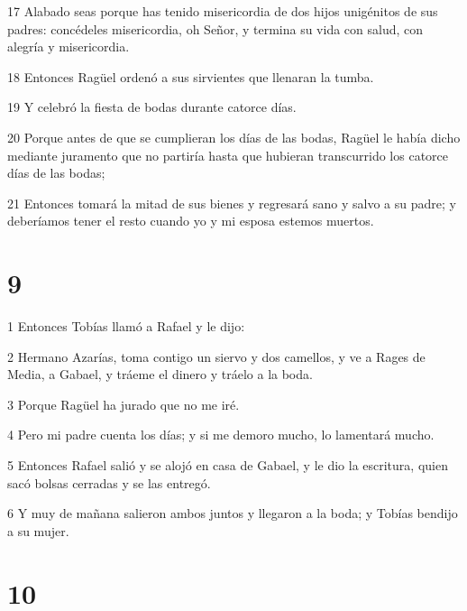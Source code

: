 \par 17 Alabado seas porque has tenido misericordia de dos hijos unigénitos de sus padres: concédeles misericordia, oh Señor, y termina su vida con salud, con alegría y misericordia.
\par 18 Entonces Ragüel ordenó a sus sirvientes que llenaran la tumba.
\par 19 Y celebró la fiesta de bodas durante catorce días.
\par 20 Porque antes de que se cumplieran los días de las bodas, Ragüel le había dicho mediante juramento que no partiría hasta que hubieran transcurrido los catorce días de las bodas;
\par 21 Entonces tomará la mitad de sus bienes y regresará sano y salvo a su padre; y deberíamos tener el resto cuando yo y mi esposa estemos muertos.

\chapter{9}

\par 1 Entonces Tobías llamó a Rafael y le dijo:
\par 2 Hermano Azarías, toma contigo un siervo y dos camellos, y ve a Rages de Media, a Gabael, y tráeme el dinero y tráelo a la boda.
\par 3 Porque Ragüel ha jurado que no me iré.
\par 4 Pero mi padre cuenta los días; y si me demoro mucho, lo lamentará mucho.
\par 5 Entonces Rafael salió y se alojó en casa de Gabael, y le dio la escritura, quien sacó bolsas cerradas y se las entregó.
\par 6 Y muy de mañana salieron ambos juntos y llegaron a la boda; y Tobías bendijo a su mujer.

\chapter{10}

